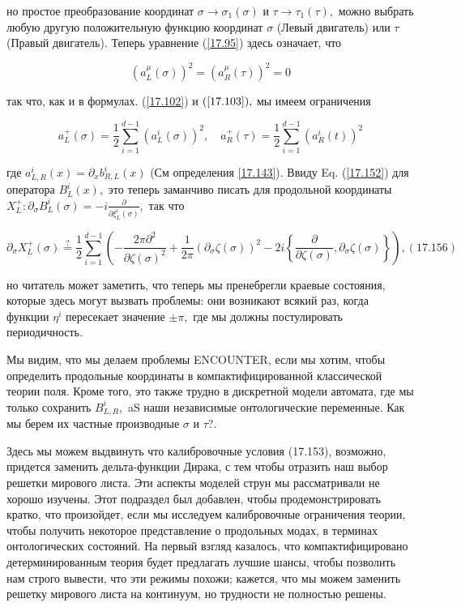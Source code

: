 \documentclass[main.tex]{subfiles}
\begin{document}
но простое преобразование координат $\sigma \rightarrow \sigma_{1}(\sigma)$ и $\tau \rightarrow \tau_{1}(\tau),$ можно выбрать любую другую положительную функцию координат $\sigma$ (Левый двигатель) или $\tau$ (Правый двигатель). Теперь уравнение (\ref{17.95}) здесь означает, что

$$
\left(a_{L}^{\mu}(\sigma)\right)^{2}=\left(a_{R}^{\mu}(\tau)\right)^{2}=0
$$

так что, как и в формулах. (\ref{17.102}) и $(\ref{17.103}),$ мы имеем ограничения

$$
a_{L}^{+}(\sigma)=\frac{1}{2} \sum_{i=1}^{d-1}\left(a_{L}^{i}(\sigma)\right)^{2}, \quad a_{R}^{+}(\tau)=\frac{1}{2} \sum_{i=1}^{d-1}\left(a_{R}^{i}(t)\right)^{2}
$$

где $a_{L, R}^{i}(x)=\partial_{x} b_{R, L}^{i}(x)$ (См определения \ref{17.143}). Ввиду Eq. (\ref{17.152}) для оператора $B_{L}^{i}(x),$ это теперь заманчиво писать для продольной координаты $X_{L}^{+}: \partial_{\sigma} B_{L}^{i}(\sigma)=-i \frac{\partial}{\partial \xi_{L}^{i}(\sigma)},$ так что

$$
\partial_{\sigma} X_{L}^{+}(\sigma) \stackrel{?}{=} \frac{1}{2} \sum_{i=1}^{d-1}\left(-\frac{2 \pi \partial^{2}}{\partial \zeta(\sigma)^{2}}+\frac{1}{2 \pi}\left(\partial_{\sigma} \zeta(\sigma)\right)^{2}-2 i\left\{\frac{\partial}{\partial \zeta(\sigma)}, \partial_{\sigma} \zeta(\sigma)\right\}\right),(17.156)
$$

но читатель может заметить, что теперь мы пренебрегли краевые состояния, которые здесь могут вызвать проблемы: они возникают всякий раз, когда функции $\eta^{i}$ пересекает значение $\pm \pi,$ где мы должны постулировать периодичность.

Мы видим, что мы делаем проблемы ENCOUNTER, если мы хотим, чтобы определить продольные координаты в компактифицированной классической теории поля. Кроме того, это также трудно в дискретной модели автомата, где мы только сохранить $B_{L, R}^{i},$ aS наши независимые онтологические переменные. Как мы берем их частные производные $\sigma$ и $\tau$?.

Здесь мы можем выдвинуть что калибровочные условия (17.153), возможно, придется заменить дельта-функции Дирака, с тем чтобы отразить наш выбор решетки мирового листа. Эти аспекты моделей струн мы рассматривали не хорошо изучены. Этот подраздел был добавлен, чтобы продемонстрировать кратко, что произойдет, если мы исследуем калибровочные ограничения теории, чтобы получить некоторое представление о продольных модах, в терминах онтологических состояний. На первый взгляд казалось, что компактифицировано детерминированным теория будет предлагать лучшие шансы, чтобы позволить нам строго вывести, что эти режимы похожи; кажется, что мы можем заменить решетку мирового листа на континуум, но трудности не полностью решены.
\end{document}
